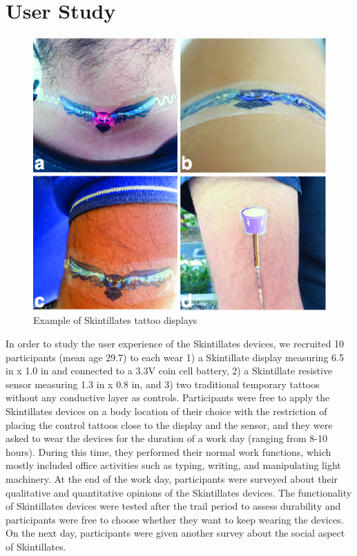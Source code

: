 \documentclass{sigchi}
\begin{document}
\section {User Study}
\begin{figure} [b!]
\centering
\includegraphics[width=1\columnwidth]{figures/Figure11}
\caption{Example of Skintillates tattoo displays}
\vspace{-8pt}
\label{fig:userstudy}
\end{figure}
In order to study the user experience of the Skintillates devices, we recruited 10 participants (mean age 29.7) to each wear 1) a Skintillate display measuring 6.5 in x 1.0 in and connected to a 3.3V coin cell battery, 2) a Skintillate resistive sensor measuring 1.3 in x 0.8 in, and 3) two traditional temporary tattoos without any conductive layer as controls. Participants were free to apply the Skintillates devices on a body location of their choice with the restriction of placing the control tattoos close to the display and the sensor,  and they were asked to wear the devices for the duration of a work day (ranging from 8-10 hours). During this time, they performed their normal work functions, which mostly included office activities such as typing, writing, and manipulating light machinery. At the end of the work day, participants were surveyed about their qualitative and quantitative opinions of the Skintillates devices. The functionality of Skintillates devices were tested after the trail period to assess durability and participants were free to choose whether they want to keep wearing the devices. On the next day, participants were given another survey about the social aspect of Skintillates.
\end{document}
